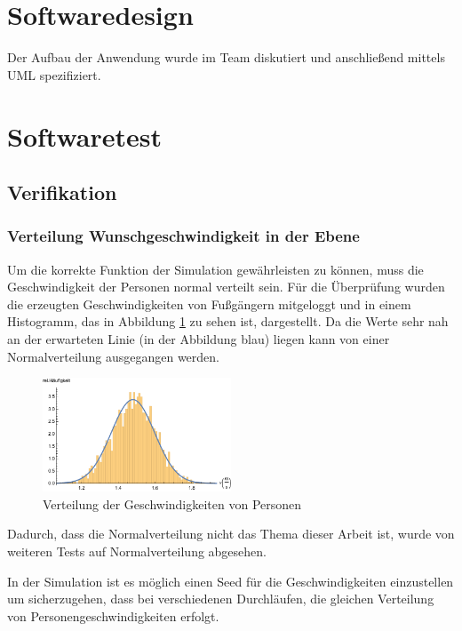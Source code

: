 
\section{Softwaredesign}

Der Aufbau der Anwendung wurde im Team diskutiert und anschließend mittels UML spezifiziert.


\section{Softwaretest}





\subsection{Verifikation}

\subsubsection{Verteilung Wunschgeschwindigkeit in der Ebene}
Um die korrekte Funktion der Simulation gewährleisten zu können, muss die Geschwindigkeit der Personen normal verteilt sein. Für die Überprüfung wurden die erzeugten Geschwindigkeiten von Fußgängern mitgeloggt und in einem Histogramm, das in Abbildung \ref{fig:Verteilung_Geschwindigkeit} zu sehen ist, dargestellt. Da die Werte sehr nah an der erwarteten Linie (in der Abbildung blau) liegen kann von einer Normalverteilung ausgegangen werden.

\begin{figure}[htpb]
	\centering
	\includegraphics[width=0.5\textwidth]{abbildungen/histogramm.pdf}
	\caption{Verteilung der Geschwindigkeiten von Personen}
	\label{fig:Verteilung_Geschwindigkeit}
\end{figure}  

Dadurch, dass die Normalverteilung nicht das Thema dieser Arbeit ist, wurde von weiteren Tests auf Normalverteilung abgesehen.

In der Simulation ist es möglich einen Seed für die Geschwindigkeiten einzustellen um sicherzugehen, dass bei verschiedenen Durchläufen, die gleichen Verteilung von Personengeschwindigkeiten erfolgt.

